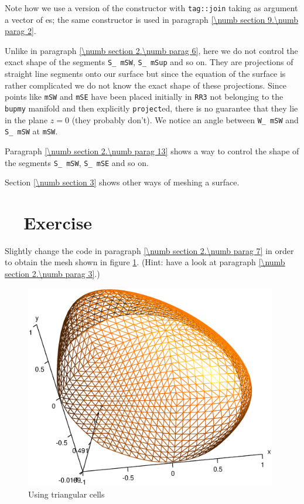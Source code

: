 Note how we use a version of the {\small\tt {}} constructor with {\small\tt \textcolor{tag}{tag}::join}
taking as argument a vector of {\small\tt {}}es; the same constructor is used in
paragraph \ref{\numb section 9.\numb parag 2}.

Unlike in paragraph \ref{\numb section 2.\numb parag 6}, here we do not control the
exact shape of the segments {\small\tt S\_\,mSW}, {\small\tt S\_\,mSup} and so on.
They are projections of straight line segments onto our surface but since the equation
of the surface is rather complicated we do not know the exact shape of these projections.
Since points like {\small\tt mSW} and {\small\tt mSE} have been placed initially in
{\small\tt RR3} not belonging to the {\small\tt bupmy} manifold and then explicitly
{\small\tt project}ed,
there is no guarantee that they lie in the plane $ z = 0 $ (they probably don't).
We notice an angle between {\small\tt W\_\,mSW} and {\small\tt S\_\,mSW} at {\small\tt mSW}.

Paragraph \ref{\numb section 2.\numb parag 13} shows a way to control the shape of the segments
{\small\tt S\_\,mSW}, {\small\tt S\_\,mSE} and so on.

Section \ref{\numb section 3} shows other ways of meshing a surface.


\section{~~Exercise}\label{\numb section 2.\numb parag 8}

Slightly change the code in paragraph \ref{\numb section 2.\numb parag 7}
in order to obtain the mesh shown in figure \ref{\numb section 2.\numb fig 8}.
(Hint: have a look at paragraph \ref{\numb section 2.\numb parag 3}.)

\begin{figure}[ht] \centering
  \includegraphics[width=110mm]{hemisphere-1}
  \caption{Using triangular cells}
  \label{\numb section 2.\numb fig 8}
\end{figure}



